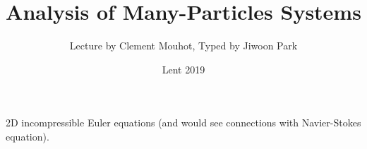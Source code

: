 \documentclass[12pt,a4paper]{extarticle}
\DeclarePairedDelimiter\bignorm{\lVert}{\rVert}
\begin{document}
\newcommand{\doublerule}[1][.4pt]{%
  \noindent
  \makebox[0pt][l]{\rule[.7ex]{#1\linewidth}{0.5pt}}%
  \rule[.3ex]{#1\linewidth}{0.5pt}
  }
\newcommand{\newday}[1]{\doublerule{0.4}#1\doublerule{0.4}}

\newcommand{\lap}{\triangle} %
\newcommand{\s}{\vspace{10pt}}
\newcommand{\reals}{\mathbb{R}}

\newcommand{\eop}{\hfill  \textsl{(End of proof)} $\square$} %
\newcommand{\eos}{\hfill  \textsl{(End of statement)} $\square$} %

\newcommand{\norms}[2]{\bignorm[\big]{#1}_{#2}}
\newcommand{\snorms}[2]{\bignorm[\small]{#1}_{#2}}
\newcommand{\avg}{\mathbb{E}}
\newcommand{\prob}{\mathbb{P}}
\newcommand{\borel}{\mathscr{B}}
\newcommand{\EE}{\mathscr{E}}
\newcommand{\FF}{\mathscr{F}}
\newcommand{\LL}{\mathscr{L}}
\newcommand{\DD}{\mathscr{D}}
\newcommand{\GG}{\mathscr{G}}
\newcommand{\pa}{\partial}
\newcommand{\charac}{\bm{1}}
\let\emptyset\varnothing

\newcommand{\var}{\textnormal{Var}}
\newcommand{\ent}{\textnormal{Ent}}
\newcommand{\definer}{\mathbin{=\mkern-5.5mu\raisebox{0.9pt}{\scalebox{0.8}[0.8]{\textnormal{:}}}}}
\newcommand{\definel}{\mathbin{\raisebox{0.9pt}{\scalebox{0.8}[0.8]{\textnormal{:}}}\mkern-5.5mu=}}

\renewcommand{\vec}{\underline}
\renewcommand{\bar}{\overline}

\setcounter{callcounter}{0}

\newcommand{\call}{\tag{\arabic{section}.\arabic{callcounter}} \stepcounter{callcounter}}

\newcommand{\comment}[1]{\textcolor{red}{#1}}

\setlength\parindent{0pt}

\title{Analysis of Many-Particles Systems}
\author{Lecture by Clement Mouhot, Typed by Jiwoon Park}
\date{Lent 2019}
\maketitle
\s

2D incompressible Euler equations (and would see connections with Navier-Stokes equation).
\s
\end{document}
